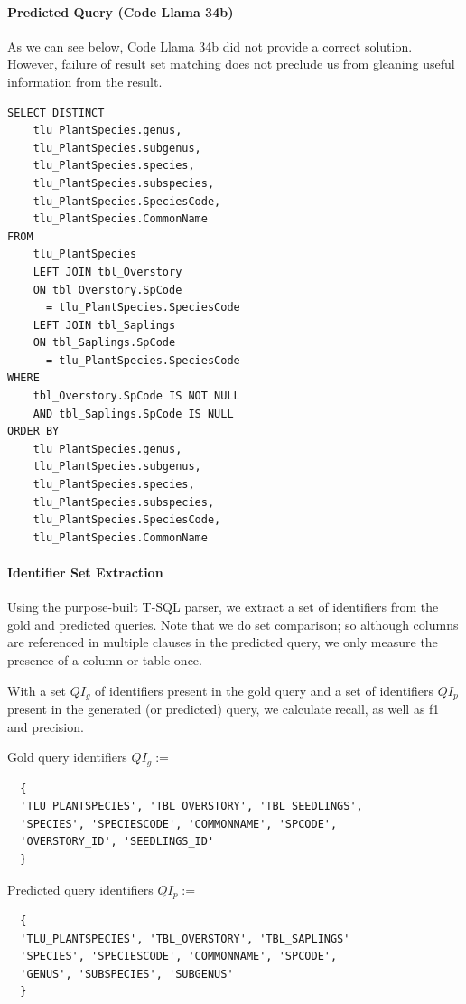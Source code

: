 \paragraph{Predicted Query (Code Llama 34b)} 
As we can see below, Code Llama 34b did not provide a correct solution.
However, failure of result set matching does not preclude us from gleaning useful information from the result.
\begin{verbatim}
SELECT DISTINCT
	tlu_PlantSpecies.genus,
	tlu_PlantSpecies.subgenus,
	tlu_PlantSpecies.species,
	tlu_PlantSpecies.subspecies,
	tlu_PlantSpecies.SpeciesCode,
	tlu_PlantSpecies.CommonName
FROM
	tlu_PlantSpecies
	LEFT JOIN tbl_Overstory 
    ON tbl_Overstory.SpCode 
      = tlu_PlantSpecies.SpeciesCode
	LEFT JOIN tbl_Saplings 
    ON tbl_Saplings.SpCode 
      = tlu_PlantSpecies.SpeciesCode
WHERE
	tbl_Overstory.SpCode IS NOT NULL
	AND tbl_Saplings.SpCode IS NULL
ORDER BY
	tlu_PlantSpecies.genus,
	tlu_PlantSpecies.subgenus,
	tlu_PlantSpecies.species,
	tlu_PlantSpecies.subspecies,
	tlu_PlantSpecies.SpeciesCode,
	tlu_PlantSpecies.CommonName
\end{verbatim}

\paragraph{Identifier Set Extraction}
Using the purpose-built T-SQL parser, we extract a set of identifiers from the gold and predicted queries.
Note that we do set comparison; so although columns are referenced in multiple clauses in the predicted query, we only measure the presence of a column or table once.

With a set $QI_g$ of identifiers present in the gold query and a set of identifiers $QI_p$ present in the generated (or predicted) query, we calculate recall, as well as f1 and precision.

Gold query identifiers $QI_g :=$ 
  \begin{verbatim}
  {
  'TLU_PLANTSPECIES', 'TBL_OVERSTORY', 'TBL_SEEDLINGS',
  'SPECIES', 'SPECIESCODE', 'COMMONNAME', 'SPCODE',
  'OVERSTORY_ID', 'SEEDLINGS_ID'
  }
\end{verbatim}

Predicted query identifiers $QI_p :=$ 
\begin{verbatim}
  {
  'TLU_PLANTSPECIES', 'TBL_OVERSTORY', 'TBL_SAPLINGS'
  'SPECIES', 'SPECIESCODE', 'COMMONNAME', 'SPCODE',
  'GENUS', 'SUBSPECIES', 'SUBGENUS'
  }
\end{verbatim}


